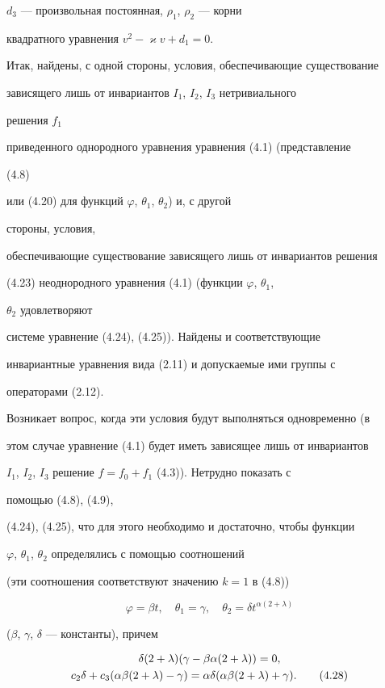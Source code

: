 $d_3$ --- произвольная постоянная, $\rho_1$, $\rho_2$ --- корни


квадратного уравнения $v^2-\varkappa v+d_1=0$.





Итак, найдены, с одной стороны, условия, обеспечивающие существование


зависящего лишь от инвариантов $I_1$, $I_2$, $I_3$ нетривиального


решения $f_1$


приведенного однородного уравнения уравнения (4.1) (представление


(4.8)


или (4.20) для функций $\varphi$, $\theta_1$, $\theta_2$) и, с другой


стороны, условия,


обеспечивающие существование зависящего лишь от инвариантов решения


(4.23) неоднородного уравнения (4.1) (функции $\varphi$, $\theta_1$,


$\theta_2$ удовлетворяют


системе уравнение (4.24), (4.25)). Найдены и соответствующие


инвариантные уравнения вида (2.11) и допускаемые ими группы с


операторами (2.12).





Возникает вопрос, когда эти условия будут выполняться одновременно (в


этом случае уравнение (4.1) будет иметь зависящее лишь от инвариантов


$I_1$, $I_2$, $I_3$ решение $f=f_0+f_1$ (4.3)). Нетрудно показать с


помощью (4.8), (4.9),


(4.24), (4.25), что для этого необходимо и достаточно, чтобы функции


$\varphi$, $\theta_1$, $\theta_2$ определялись с помощью соотношений


(эти соотношения соответствуют значению $k=1$ в (4.8))


$$


\varphi=\beta t,\quad \theta_1=\gamma,\quad


\theta_2=\delta t^{\alpha(2+\lambda)}


$$


($\beta$, $\gamma$, $\delta$ --- константы), причем


\begin{gather}


\delta(2+\lambda)(\gamma-\beta \alpha(2+\lambda))=0,\notag\\


c_2\delta+c_3(\alpha\beta(2+\lambda)-\gamma)=


\alpha\delta(\alpha\beta(2+\lambda)+\gamma).


\tag{4.28}


\end{gather}



